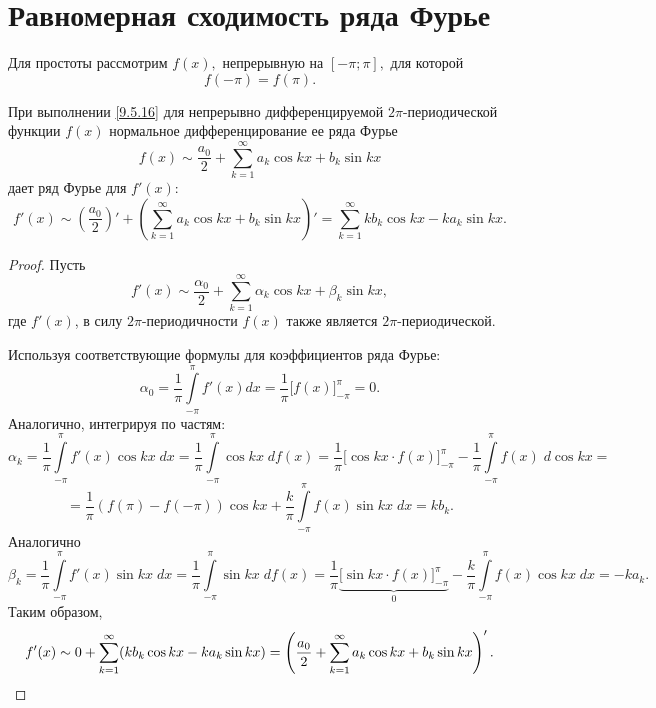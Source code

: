 \documentclass[../../main.tex]{subfiles}
\begin{document}
\section{Равномерная сходимость ряда Фурье}
	Для простоты рассмотрим $f(x),$ непрерывную на $[-\pi; \pi],$ для которой 
	\begin{equation}\label{9.5.16}
	f(-\pi) = f(\pi).
	\end{equation}
	\begin{thm}
		При выполнении \eqref{9.5.16} для непрерывно дифференцируемой 
		$2\pi$-периодической функции $f(x)$ нормальное дифференцирование ее ряда Фурье
		\[
		f(x) \sim \frac{a_0}{2} + \sum_{k=1}^{\infty}  a_k \cos k x +
		b_k \sin k x
		\]
		дает ряд Фурье для $f'(x):$
		\begin{equation} \label{9.5.17}
			f'(x) \sim \left(\frac{a_0}{2}\right)' + \left(\sum_{k=1}^{\infty}  a_k 
			\cos k x +
			b_k \sin k x\right)' = \sum_{k=1}^{\infty} k b_k \cos k x - k
			a_k \sin k x.
		\end{equation}
	\end{thm}
	\begin{proof}
		Пусть
		\[
			f'(x) \sim \frac{\alpha_0}{2} + \sum_{k=1}^{\infty}  \alpha_k \cos k x +
			\beta_k \sin k x,
		\]
		где $f'(x)$, в силу $2\pi$-периодичности $f(x)$ также является 
		$2\pi$-периодической.
		
		Используя соответствующие формулы для коэффициентов ряда Фурье:
		\[
			\alpha_0 = \frac{1}{\pi} \int\limits_{-\pi}^{\pi} f'(x) dx = \frac{1}{\pi} 
			\big[f(x)\big]_{-\pi}^{\pi} = 0.
		\]
		Аналогично, интегрируя по частям:
		\[
			\alpha_k = \frac{1}{\pi} \int\limits_{-\pi}^{\pi} f'(x) \cos kx\; dx = \frac{1}{\pi} 
			\int\limits_{-\pi}^{\pi} \cos kx\; df(x)  = \frac{1}{\pi} \big[\cos kx
			\cdot f(x)\big]_{-\pi}^{\pi} -
			\frac{1}{\pi} \int\limits_{-\pi}^{\pi} f(x)\;d \cos kx = 
			\]
			\[ =
			\frac{1}{\pi} (f(\pi) - f(-\pi)) \cos kx +
			\frac{k}{\pi} \int\limits_{-\pi}^{\pi} f(x)\sin kx\;dx = k b_k.
		\]
		Аналогично
		\[
			\beta_k = \frac{1}{\pi} \int\limits_{-\pi}^{\pi} f'(x) \sin kx\;dx
			= \frac{1}{\pi} \int\limits_{-\pi}^{\pi} \sin kx\;df(x)  =
			\frac{1}{\pi} \underbrace{\big[\sin kx \cdot f(x)\big]_{-\pi}^{\pi}}_{0} -
			\frac{k}{\pi} \int\limits_{-\pi}^{\pi} f(x) \cos kx\;dx = -ka_k.
		\]
		Таким образом, 
		\[
		f'(x) \sim 0 + \sum_{k=1}^{\infty}( k b_k \cos k x - k
		a_k \sin k x) = \left(\frac{a_0}{2} + \sum_{k=1}^{\infty}  a_k \cos k x +
		b_k \sin k x\right)'.
		\qedhere
		\]
	\end{proof}
\end{document}
